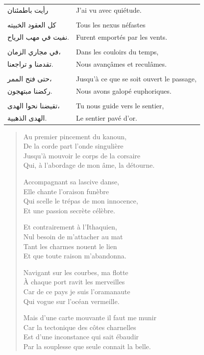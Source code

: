 \begin{longtable}{R{0.3\textwidth} L{0.65\textwidth}}
\textarabic{رأيت باطمئنان}		& J’ai vu avec quiétude.\\
\\
\textarabic{كل العقود الخبيته}		& Tous les nexus néfastes\\
\textarabic{نفيت في مهب الرياح.}		& Furent emportés par les vents.\\
\\
\textarabic{في مجاري الزمان،}		& Dans les couloirs du temps,\\
\textarabic{تقدمنا و تراجعنا.}		& Nous avançâmes et reculâmes.\\
\\
\textarabic{حتى فتح الممر،}		& Jusqu’à ce que se soit ouvert le passage,\\
\textarabic{ركضنا مبتهجون.}		& Nous avons galopé euphoriques.\\
\\
\textarabic{تقيضنا نحوا الهدى،}		& Tu nous guide vers le sentier,\\
\textarabic{الهدى الذهبية.}		& Le sentier pavé d’or.\\
\end{longtable}

\begin{verse}
Au premier pincement du kanoun,\\
De la corde part l’onde singulière\\
Jusqu’à mouvoir le corps de la corsaire\\
Qui, à l’abordage de mon âme, la détourne.

Accompagnant sa lascive danse,\\
Elle chante l’oraison funèbre\\
Qui scelle le trépas de mon innocence,\\
Et une passion secrète célèbre.

Et contrairement à l’Ithaquien,\\
Nul besoin de m’attacher au mat\\
Tant les charmes nouent le lien\\
Et que toute raison m’abandonna.

Navigant sur les courbes, ma flotte\\
À chaque port ravit les merveilles\\
Car de ce pays je suis l’oramanaute\\
Qui vogue sur l’océan vermeille.

Mais d’une carte mouvante il faut me munir\\
Car la tectonique des côtes charnelles\\
Est d’une inconstance qui sait ébaudir\\
Par la souplesse que seule connait la belle.
\end{verse}



